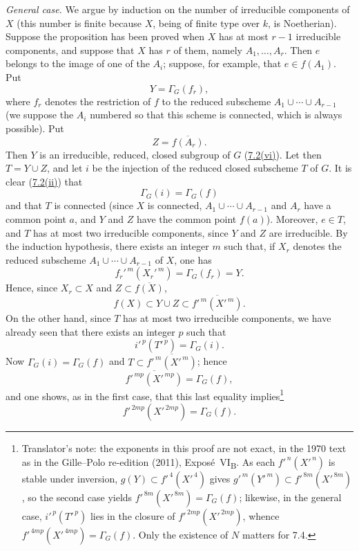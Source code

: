 \emph{General case.}
We argue by induction on the number of irreducible components
of \(X\) (this number is finite because \(X\), being of finite
type over \(k\), is Noetherian). Suppose the proposition has
been proved when \(X\) has at most \(r-1\) irreducible
components, and suppose that \(X\) has \(r\) of them, namely
\(A_1,\ldots,A_r\). Then \(e\) belongs to the image of one of the
\(A_i\); suppose, for example, that \(e\in f(A_1)\). Put
\[
  Y=\Gamma_G(f_r),
\]
where \(f_r\) denotes the restriction of \(f\) to the reduced
subscheme \(A_1\cup\cdots\cup A_{r-1}\) (we suppose the \(A_i\)
numbered so that this scheme is connected, which is always
possible). Put
\[
  Z=\overline{f(A_r)}.
\]
Then \(Y\) is an irreducible, reduced, closed subgroup of \(G\)
(\hyperref[rem:sga3-VIB-7.2-vi]{7.2\textup{(vi)}}). Let then \(T=Y\cup Z\), and let \(i\) be the
injection of the reduced closed subscheme \(T\) of \(G\). It is
clear (\hyperref[rem:sga3-VIB-7.2-ii]{7.2\textup{(ii)}}) that
\[
  \Gamma_G(i)=\Gamma_G(f)
\]
and that \(T\) is connected (since \(X\) is connected,
\(A_1\cup\cdots\cup A_{r-1}\) and \(A_r\) have a common point
\(a\), and \(Y\) and \(Z\) have the common point \(f(a)\)).
Moreover, \(e\in T\), and \(T\) has at most two irreducible
components, since \(Y\) and \(Z\) are irreducible. By the
induction hypothesis, there exists an integer \(m\) such that,
if \(X_r\) denotes the reduced subscheme
\(A_1\cup\cdots\cup A_{r-1}\) of \(X\), one has
\[
  f_r'^{\,m}(X_r'^{\,m})
  =\Gamma_G(f_r)=Y.
\]
Hence, since \(X_r\subset X\) and \(Z\subset\overline{f(X)}\),
\label{form:sga3-VIB-7.4-general-case-inclusion}%
\[
  f(X)
  \subset Y\cup Z
  \subset\overline{f'^{\,m}(X'^{\,m})}.
\]
On the other hand, since \(T\) has at most two irreducible
components, we have already seen that there exists an integer
\(p\) such that
\[
  i'^{\,p}(T'^{\,p})=\Gamma_G(i).
\]
Now \(\Gamma_G(i)=\Gamma_G(f)\) and
\(T\subset\overline{f'^{\,m}(X'^{\,m})}\); hence
\[
  \overline{f'^{\,mp}(X'^{\,mp})}=\Gamma_G(f),
\]
and one shows, as in the first case, that this last equality
implies\footnote{Translator's note: the exponents in this proof are not exact, in the 1970 text as in the
Gille--Polo re-edition (2011), Exposé~VI\textsubscript{B}. As each \(f'^{\,n}(X'^{\,n})\) is stable under
inversion, \(g(Y)\subset f'^{\,4}(X'^{\,4})\) gives \(g'^{\,m}(Y'^{\,m})\subset f'^{\,8m}(X'^{\,8m})\), so the
second case yields \(f'^{\,8m}(X'^{\,8m})=\Gamma_G(f)\); likewise, in the general case,
\(i'^{\,p}(T'^{\,p})\) lies in the closure of \(f'^{\,2mp}(X'^{\,2mp})\), whence
\(f'^{\,4mp}(X'^{\,4mp})=\Gamma_G(f)\). Only the existence of \(N\) matters for 7.4.}
\[
  f'^{\,2mp}(X'^{\,2mp})=\Gamma_G(f).
\]
